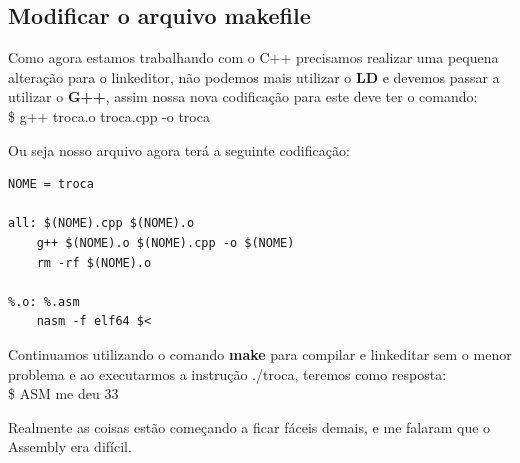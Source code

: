 \subsection{Modificar o arquivo makefile}
Como agora estamos trabalhando com o C++ precisamos realizar uma pequena alteração para o linkeditor, não podemos mais utilizar o \textbf{LD} e devemos passar a utilizar o \textbf{G++}, assim nossa nova codificação para este deve ter o comando: \\
{\ttfamily\$ g++ troca.o troca.cpp -o troca}

Ou seja nosso arquivo agora terá a seguinte codificação:
\begin{lstlisting}[]
NOME = troca

all: $(NOME).cpp $(NOME).o
	g++ $(NOME).o $(NOME).cpp -o $(NOME)
	rm -rf $(NOME).o

%.o: %.asm
	nasm -f elf64 $<	
\end{lstlisting}

Continuamos utilizando o comando \textbf{make} para compilar e linkeditar sem o menor problema e ao executarmos a instrução {\ttfamily ./troca}, teremos como resposta: \\
{\ttfamily\$ ASM me deu 33}

Realmente as coisas estão começando a ficar fáceis demais, e me falaram que o Assembly era difícil.

\clearpage